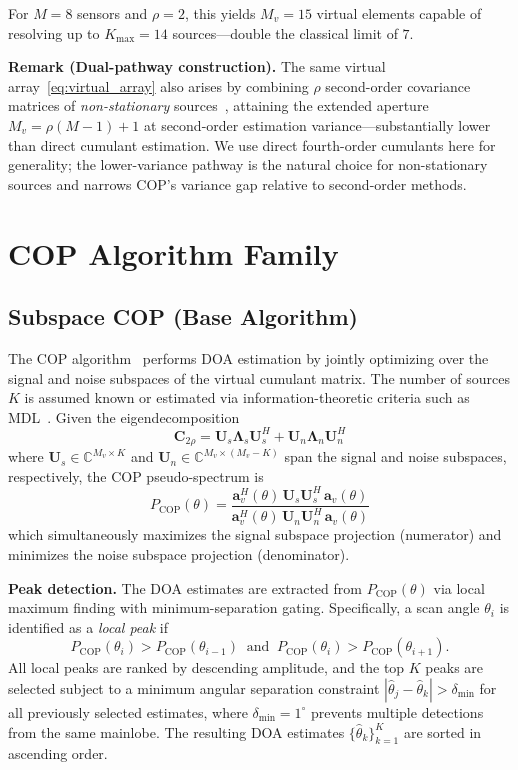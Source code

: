 \documentclass[journal]{IEEEtran}
\newcommand{\mat}[1]{\mathbf{#1}}
\newcommand{\C}{\mathbb{C}}
\begin{document}
For $M = 8$ sensors and $\rho = 2$, this yields $M_v = 15$ virtual elements capable of resolving up to $K_{\max} = 14$ sources---double the classical limit of $7$.

\textbf{Remark (Dual-pathway construction).}
The same virtual array~\eqref{eq:virtual_array} also arises by combining $\rho$ second-order covariance matrices of \emph{non-stationary} sources~\cite{choi2015underdetermined}, attaining the extended aperture $M_v=\rho(M{-}1){+}1$ at second-order estimation variance---substantially lower than direct cumulant estimation. We use direct fourth-order cumulants here for generality; the lower-variance pathway is the natural choice for non-stationary sources and narrows COP's variance gap relative to second-order methods.

\section{COP Algorithm Family}
\label{sec:cop}

\subsection{Subspace COP (Base Algorithm)}

The COP algorithm~\cite{choi2015underdetermined} performs DOA estimation by jointly optimizing over the signal and noise subspaces of the virtual cumulant matrix. The number of sources $K$ is assumed known or estimated via information-theoretic criteria such as MDL~\cite{wax1985mdl}. Given the eigendecomposition
\begin{equation}
\mat{C}_{2\rho} = \mat{U}_s \mat{\Lambda}_s \mat{U}_s^H + \mat{U}_n \mat{\Lambda}_n \mat{U}_n^H
\end{equation}
where $\mat{U}_s \in \C^{M_v \times K}$ and $\mat{U}_n \in \C^{M_v \times (M_v - K)}$ span the signal and noise subspaces, respectively, the COP pseudo-spectrum is
\begin{equation}
P_{\mathrm{COP}}(\theta) = \frac{\mat{a}_v^H(\theta)\,\mat{U}_s\mat{U}_s^H\,\mat{a}_v(\theta)}{\mat{a}_v^H(\theta)\,\mat{U}_n\mat{U}_n^H\,\mat{a}_v(\theta)}
\label{eq:cop_spectrum}
\end{equation}
which simultaneously maximizes the signal subspace projection (numerator) and minimizes the noise subspace projection (denominator).

\textbf{Peak detection.}
The DOA estimates are extracted from $P_{\mathrm{COP}}(\theta)$ via local maximum finding with minimum-separation gating. Specifically, a scan angle $\theta_i$ is identified as a \emph{local peak} if
\begin{equation}
P_{\mathrm{COP}}(\theta_i) > P_{\mathrm{COP}}(\theta_{i-1}) \;\;\text{and}\;\; P_{\mathrm{COP}}(\theta_i) > P_{\mathrm{COP}}(\theta_{i+1}).
\label{eq:local_peak}
\end{equation}
All local peaks are ranked by descending amplitude, and the top $K$ peaks are selected subject to a minimum angular separation constraint $|\hat{\theta}_j - \hat{\theta}_k| > \delta_{\min}$ for all previously selected estimates, where $\delta_{\min} = 1^\circ$ prevents multiple detections from the same mainlobe. The resulting DOA estimates $\{\hat{\theta}_k\}_{k=1}^K$ are sorted in ascending order.
\end{document}
